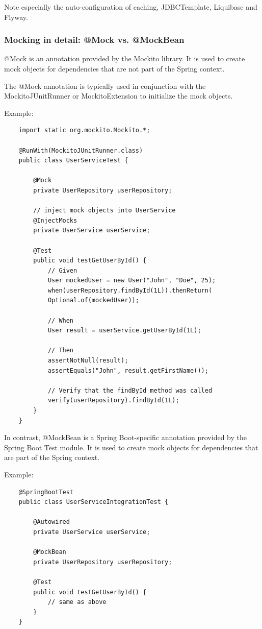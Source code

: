 \documentclass{scrartcl}
\begin{document}
Note especially the auto-configuration of caching, JDBCTemplate, Liquibase and Flyway.

\subsubsection{Mocking in detail: @Mock vs. @MockBean}

@Mock is an annotation provided by the Mockito library. It is used to create mock objects for dependencies that are not part of the Spring context.

The @Mock annotation is typically used in conjunction with the MockitoJUnitRunner or MockitoExtension to initialize the mock objects.

Example:

\begin{lstlisting}
    import static org.mockito.Mockito.*;

    @RunWith(MockitoJUnitRunner.class)
    public class UserServiceTest {

        @Mock
        private UserRepository userRepository;

        // inject mock objects into UserService
        @InjectMocks
        private UserService userService;

        @Test
        public void testGetUserById() {
            // Given
            User mockedUser = new User("John", "Doe", 25);
            when(userRepository.findById(1L)).thenReturn(
            Optional.of(mockedUser));

            // When
            User result = userService.getUserById(1L);

            // Then
            assertNotNull(result);
            assertEquals("John", result.getFirstName());

            // Verify that the findById method was called
            verify(userRepository).findById(1L);
        }
    }
\end{lstlisting}

In contrast, @MockBean is a Spring Boot-specific annotation provided by the Spring Boot Test module. It is used to create mock objects for dependencies that are part of the Spring context.

Example:

\begin{lstlisting}
    @SpringBootTest
    public class UserServiceIntegrationTest {

        @Autowired
        private UserService userService;

        @MockBean
        private UserRepository userRepository;

        @Test
        public void testGetUserById() {
            // same as above
        }
    }
\end{lstlisting}
\end{document}

